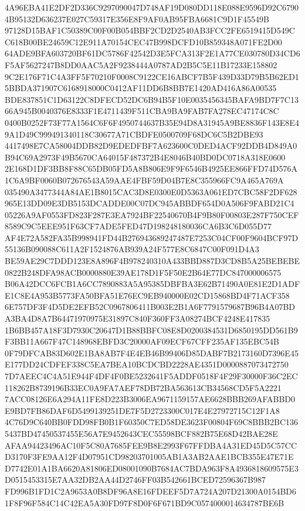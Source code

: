 \documentclass[UTF8,fontset=fandol,zihao=-4,a4paper]{ctexart}
\begin{document}
{{4A96EBA41E2DF2D336C9297090047D748AF19D080DD118E088E9596D92C67904B95132D636237E027C59317E356E8F9AF0AB95FBA6681C9D1F45549B
97128D15BAF1C50389C00F00B054BBF2CD2D2540AB3FCC2FE6519415D549CC618B00BE24659C12E911A70154CEC47B998DCFD10B859348A071FE2D00
64ADE9BFA603720BF61DC5786F42542D3E5FCA313F2E1A77CE030780D34CD6F5AF5627247B8DD0AAC5A2F9238444A0787AD2B5C5E11B17233E158802
9C2E176F71C4A3FF5F70210F0008C9122CE16ABCF7B5F439D33D79B5B62ED15BBDA371907C6168918000C0412AF11DD6B8BB7E1420AD416A86A00535
BDE837851C1D63122C8DFECD52DC6B94B5F10E0035456345BAFA9BD7F7C1366A945B0040376E8333F1E4711439F511CBA9BA9FAB7FA278EC47174C8C
0400B0252F73F77A1564C6F6F4950744637B35E94D8A31945A9BE8836F143E8E49A1D49C999491340118C30677A71CBDFE0500709F68DC6C5B2DBE93
4417498E7CA58004DDB82D9EDEDFBF7A623600C0DED4ACF92DDB4D849A0B94C69A2973F49B5670CA64015F487372B4E8046B40BD0DC0718A318E0600
2E168D1DF3BB8F88C65DB05FD5A8B806E9F9F6546B4925EE866FFD74D576A1C6A9BF0060B072676543A59AAE4FBF59D04B7E8C355966FC9A465A769A
035490A3477344A84AE1B8015CAC3D8E0300E0D5363A061ED7CBC58F2DF628965E13DD09E3DB5153DCADDE00C07DC945ABBDF654D0A506F9FABD21C4
05226A9AF0553FD823F287E3EA7924BF22540670B4F9B80F00803E287F750CEF8589C9C5EEE951F63CF7ADE5FED47D198248180036CA6B3C6D055D77
AF4E72A582FA35B998941FD44B276943689247487E7253C04CF00F9604BCF97D55136B090088C611A2F1524876AB939A24F577E8C6847C00F091D4A3
BE59AE29C7DDD123E8A896F4B978240310A433BBD887D3CD8B5A25BEBEBE0822B248DFA98ACB0000880E39AE178D1F5F50E2B64E77DC847000006575
B06A42DCC6FCB1A6CC7890883A5A95385DBFBA3E62B71490A0E81E2D1ADFE1C8E4A953B5773FA50BFA51E76EC9EB940000E02CD15868BD4F71ACF358
6E757DF3F4D5DE2EFB52C0967806411B003E2B1A6F7791579687B96B4A07BDA3BA4D8A7B64471970975E31897C840F360FF3A08274BCF4248E417835
1B6BB457A18F3D7930C20647D1B88BBFC08E8D0200384531D6850195DD561B9F3BB11A667F47C148968EBFD3C20000AF09ECF67CFF235AF135EBC54B
0F79DFCAB83D602E1BA8AB7F4E4EB46B99406D85DABF7B2173160D7396E45E177DD24CDFEF338C5EA7BEA10BCDCBD2228AE4351D0000887073472750
7D7AEEC4C4A51E944F4DF4F0BE5232641F5ADDF0518F4F29F30000F36C2EC118262B8739196B33EC0A9FA7AEF78DB72BA563613CB34568CD5F5A2221
7ACC08126E6A294A11FE8D223B3006EA9671159157AE6628BBB269AFABBD0E9BD7FB86DAF6D5499139251DE7F5D2723300C017E4E27972715C12F1A8
4C76D9C640BB0FDD98FB0B1F60350C7ED58DE3623F00804F69C8BBB2BC1365437BD47450537455E56A7E9452643CEC55598BCF882B75E68D42BAE28E
AFAA94423496AC10F5C80A7685FEE9B8E2993F67FFDBA4A31ED45D5C57CCD3170F3FE9AA12F4D07951CD98203701005AB1A3AB2AAE1BCB355E47E71E
D7742E01A1BA6620A81806ED08001090B7684AC7BDA963F8A4936818609575E3D0515453315E7AA32DB2AA44D2746FF03B542661BCED72596367B987
FD996B1FD1C2A9653A0B8DF96A8E16FDEEF5D7A724A207D21300A0154BD61F8F96F584C14C42EA5A30FD97F8D0F6F671BD9C0574000014634787BE6B
}}
\end{document}
